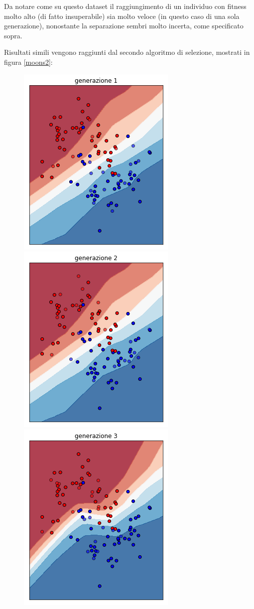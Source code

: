 \documentclass[12pt,a4paper]{report}
\begin{document}
Da notare come su questo dataset il raggiungimento di un individuo con fitness molto alto (di fatto insuperabile) sia molto veloce (in questo caso di una sola generazione), nonostante la separazione sembri molto incerta, come specificato sopra.

Risultati simili vengono raggiunti dal secondo algoritmo di selezione, mostrati in figura \ref{moons2}:

\begin{figure}[H]
 \centering
 \includegraphics[scale = 0.5]{images/moons-sons-acc./1}
 \includegraphics[scale = 0.5]{images/moons-sons-acc./2}
 \includegraphics[scale = 0.5]{images/moons-sons-acc./3}

\end{figure}
\end{document}
